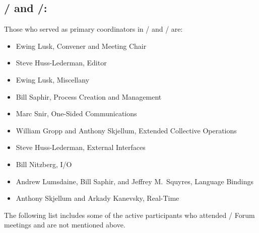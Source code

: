 \medskip

\subsection*{\MPIIDOTII/ and \MPIIIDOTO/:} 

Those who served as primary coordinators in \mpiidotii/ and \mpiiidoto/ are:

\begin{itemize}
\item Ewing Lusk, Convener and Meeting Chair
\item Steve Huss-Lederman, Editor
\item Ewing Lusk, Miscellany
\item Bill Saphir, Process Creation and Management
\item Marc Snir, One-Sided Communications
\item William Gropp and Anthony Skjellum, Extended Collective Operations
\item Steve Huss-Lederman, External Interfaces
\item Bill Nitzberg, I/O
\item Andrew Lumsdaine, Bill Saphir, and Jeffrey M.~Squyres, Language Bindings
\item Anthony Skjellum and Arkady Kanevsky, Real-Time
\end{itemize}

The following list includes some of the active participants who
attended \MPIII/ Forum meetings and are not mentioned above.

